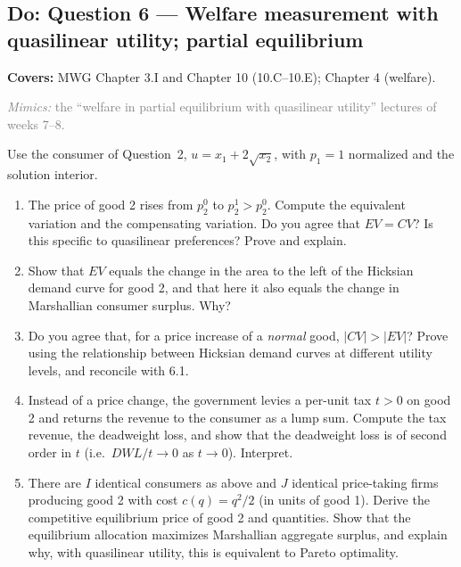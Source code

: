 \documentclass[11pt]{article}
\newcommand{\covers}[1]{\par\noindent\textcolor{blue!60!black}{\small\textbf{Covers:} #1}\medskip}
\newcommand{\mimic}[1]{\par\noindent\textcolor{gray}{\small\textit{Mimics:} #1}\medskip}
\begin{document}
\subsection{Do: Question 6 --- Welfare measurement with quasilinear utility; partial equilibrium}
\covers{MWG Chapter 3.I and Chapter 10 (10.C--10.E); Chapter 4 (welfare).}
\mimic{the ``welfare in partial equilibrium with quasilinear utility'' lectures of weeks 7--8.}

Use the consumer of Question~2, $u=x_1+2\sqrt{x_2}$, with $p_1=1$ normalized and the solution interior.
\begin{enumerate}[label=\textbf{6.\arabic*}]
  \item The price of good 2 rises from $p_2^0$ to $p_2^1>p_2^0$. Compute the equivalent variation and the compensating variation. Do you agree that $EV=CV$? Is this specific to quasilinear preferences? Prove and explain.
  \item Show that $EV$ equals the change in the area to the left of the Hicksian demand curve for good 2, and that here it also equals the change in Marshallian consumer surplus. Why?
  \item Do you agree that, for a price increase of a \emph{normal} good, $|CV|>|EV|$? Prove using the relationship between Hicksian demand curves at different utility levels, and reconcile with 6.1.
  \item Instead of a price change, the government levies a per-unit tax $t>0$ on good 2 and returns the revenue to the consumer as a lump sum. Compute the tax revenue, the deadweight loss, and show that the deadweight loss is of second order in $t$ (i.e.\ $DWL/t\to0$ as $t\to0$). Interpret.
  \item There are $I$ identical consumers as above and $J$ identical price-taking firms producing good 2 with cost $c(q)=q^2/2$ (in units of good 1). Derive the competitive equilibrium price of good 2 and quantities. Show that the equilibrium allocation maximizes Marshallian aggregate surplus, and explain why, with quasilinear utility, this is equivalent to Pareto optimality.
\end{enumerate}
\end{document}
